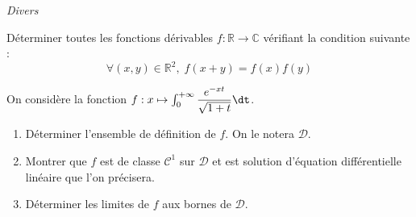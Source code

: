 \documentclass[a4paper,10pt]{report}
\begin{document}
\medskip

\begin{center}
\textit{{ {\large Divers}}}
\end{center}

\medskip








\begin{Exercice}{} Déterminer toutes les fonctions dérivables $f : \mathbb{R} \rightarrow \mathbb{C}$ vérifiant la condition suivante :
$$ \forall (x,y) \in \mathbb{R}^2, \; f(x+y)=f(x)f(y)$$
\end{Exercice}

%
%
%
%
%


\begin{Exercice}{} On considère la fonction $f : x \mapsto \int_0^{+ \infty} \dfrac{e^{-xt}}{\sqrt{1+t}} \dt$.
\begin{enumerate}
\item Déterminer l'ensemble de définition de $f$. On le notera $\mathcal{D}$.
\item Montrer que $f$ est de classe $\mathcal{C}^1$ sur $\mathcal{D}$ et est solution d'équation différentielle linéaire que l'on précisera.
\item Déterminer les limites de $f$ aux bornes de $\mathcal{D}$.
\end{enumerate}
\end{Exercice}
\end{document}
